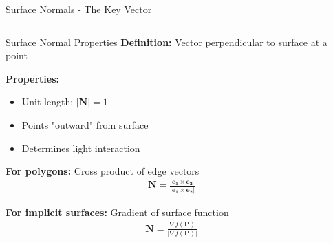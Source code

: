 \begin{frame}{Surface Normals - The Key Vector}
  \begin{columns}
    \begin{column}{0.6\textwidth}
      \begin{mathbox}{Surface Normal Properties}
        \textbf{Definition:} Vector perpendicular to surface at a point

        \vspace{0.3cm}
        \textbf{Properties:}
        \begin{itemize}
          \item Unit length: $|\mathbf{N}| = 1$
          \item Points "outward" from surface
          \item Determines light interaction
        \end{itemize}

        \vspace{0.3cm}
        \pause
        \textbf{For polygons:} Cross product of edge vectors
        \begin{align}
          \mathbf{N} = \frac{\mathbf{e_1} \times \mathbf{e_2}}{|\mathbf{e_1} \times \mathbf{e_2}|}
        \end{align}

        \pause
        \textbf{For implicit surfaces:} Gradient of surface function
        \begin{align}
          \mathbf{N} = \frac{\nabla f(\mathbf{P})}{|\nabla f(\mathbf{P})|}
        \end{align}
      \end{mathbox}
    \end{column}
    \begin{column}{0.4\textwidth}
\end{column}
\end{columns}
\end{frame}
